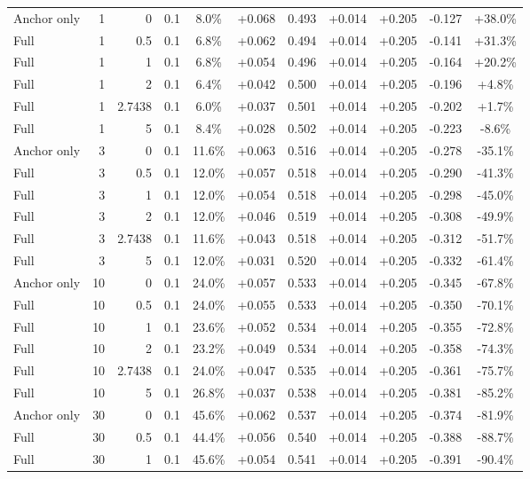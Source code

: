 \begin{table}[htbp]
\begin{tabular}{lrrrccccccc}
Anchor only & 1 & 0 & 0.1 & 8.0\% & +0.068 & 0.493 & +0.014 & +0.205 & -0.127 & +38.0\% \\
Full & 1 & 0.5 & 0.1 & 6.8\% & +0.062 & 0.494 & +0.014 & +0.205 & -0.141 & +31.3\% \\
Full & 1 & 1 & 0.1 & 6.8\% & +0.054 & 0.496 & +0.014 & +0.205 & -0.164 & +20.2\% \\
Full & 1 & 2 & 0.1 & 6.4\% & +0.042 & 0.500 & +0.014 & +0.205 & -0.196 & +4.8\% \\
Full & 1 & 2.7438 & 0.1 & 6.0\% & +0.037 & 0.501 & +0.014 & +0.205 & -0.202 & +1.7\% \\
Full & 1 & 5 & 0.1 & 8.4\% & +0.028 & 0.502 & +0.014 & +0.205 & -0.223 & -8.6\% \\
Anchor only & 3 & 0 & 0.1 & 11.6\% & +0.063 & 0.516 & +0.014 & +0.205 & -0.278 & -35.1\% \\
Full & 3 & 0.5 & 0.1 & 12.0\% & +0.057 & 0.518 & +0.014 & +0.205 & -0.290 & -41.3\% \\
Full & 3 & 1 & 0.1 & 12.0\% & +0.054 & 0.518 & +0.014 & +0.205 & -0.298 & -45.0\% \\
Full & 3 & 2 & 0.1 & 12.0\% & +0.046 & 0.519 & +0.014 & +0.205 & -0.308 & -49.9\% \\
Full & 3 & 2.7438 & 0.1 & 11.6\% & +0.043 & 0.518 & +0.014 & +0.205 & -0.312 & -51.7\% \\
Full & 3 & 5 & 0.1 & 12.0\% & +0.031 & 0.520 & +0.014 & +0.205 & -0.332 & -61.4\% \\
Anchor only & 10 & 0 & 0.1 & 24.0\% & +0.057 & 0.533 & +0.014 & +0.205 & -0.345 & -67.8\% \\
Full & 10 & 0.5 & 0.1 & 24.0\% & +0.055 & 0.533 & +0.014 & +0.205 & -0.350 & -70.1\% \\
Full & 10 & 1 & 0.1 & 23.6\% & +0.052 & 0.534 & +0.014 & +0.205 & -0.355 & -72.8\% \\
Full & 10 & 2 & 0.1 & 23.2\% & +0.049 & 0.534 & +0.014 & +0.205 & -0.358 & -74.3\% \\
Full & 10 & 2.7438 & 0.1 & 24.0\% & +0.047 & 0.535 & +0.014 & +0.205 & -0.361 & -75.7\% \\
Full & 10 & 5 & 0.1 & 26.8\% & +0.037 & 0.538 & +0.014 & +0.205 & -0.381 & -85.2\% \\
Anchor only & 30 & 0 & 0.1 & 45.6\% & +0.062 & 0.537 & +0.014 & +0.205 & -0.374 & -81.9\% \\
Full & 30 & 0.5 & 0.1 & 44.4\% & +0.056 & 0.540 & +0.014 & +0.205 & -0.388 & -88.7\% \\
Full & 30 & 1 & 0.1 & 45.6\% & +0.054 & 0.541 & +0.014 & +0.205 & -0.391 & -90.4\% \\

\end{tabular}
\end{table}
